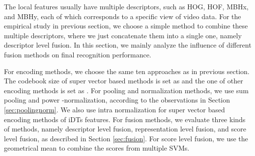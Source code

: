 \documentclass[twocolumn]{svjour3}          \smartqed  \usepackage{slashbox}
\begin{document}
The local features usually have multiple descriptors, such as HOG, HOF, MBHx, and MBHy, each of which corresponds to a specific view of video data. For the empirical study in previous section, we choose a simple method to combine these multiple descriptors, where we just concatenate them into a single one, namely descriptor level fusion. In this section, we mainly analyze the influence of different fusion methods on final recognition performance.

For encoding methods, we choose the same ten approaches as in previous section. The codebook size of super vector based methods is set as  and the one of other encoding methods is set as . For pooling and normalization methods, we use sum pooling and power -normalization, according to the observations in Section \ref{sec:poolingnorm}. We also use intra normalization for super vector based encoding methods of iDTs features. For fusion methods, we evaluate three kinds of methods, namely descriptor level fusion, representation level fusion, and score level fusion, as described in Section \ref{sec:fusion}. For score level fusion, we use the geometrical mean to combine the scores from multiple SVMs.
\end{document}
